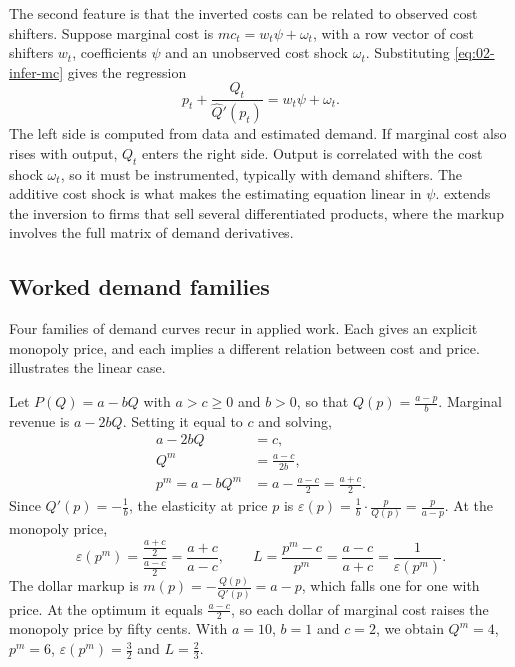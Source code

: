 The second feature is that the inverted costs can be related to observed cost shifters. Suppose marginal cost is
$mc_t = w_t\psi + \omega_t$, with a row vector of cost shifters $w_t$, coefficients $\psi$ and an unobserved cost
shock $\omega_t$. Substituting \eqref{eq:02-infer-mc} gives the regression
\begin{equation}\label{eq:02-mc-regression}
  p_t + \frac{Q_t}{\hat Q'(p_t)} = w_t\psi + \omega_t .
\end{equation}
The left side is computed from data and estimated demand. If marginal cost also rises with output, $Q_t$ enters the
right side. Output is correlated with the cost shock $\omega_t$, so it must be instrumented, typically with demand
shifters. The additive cost shock is what makes the estimating equation linear in $\psi$. 
extends the inversion to firms that sell several differentiated products, where the markup involves the full matrix
of demand derivatives.

\subsection{Worked demand families}\label{sec:02-demand-families}

Four families of demand curves recur in applied work. Each gives an explicit monopoly price, and each implies a
different relation between cost and price.  illustrates the linear case.

\begin{example}\label{ex:02-linear-monopoly}
Let $P(Q) = a - bQ$ with $a > c \ge 0$ and $b > 0$, so that $Q(p) = \frac{a - p}{b}$. Marginal revenue is
$a - 2bQ$. Setting it equal to $c$ and solving,
\begin{align*}
  a - 2bQ &= c, \\
  Q^m &= \frac{a - c}{2b}, \\
  p^m = a - bQ^m &= a - \frac{a - c}{2} = \frac{a + c}{2} .
\end{align*}
Since $Q'(p) = -\frac{1}{b}$, the elasticity at price $p$ is $\varepsilon(p) = \frac{1}{b}\cdot\frac{p}{Q(p)} =
\frac{p}{a - p}$. At the monopoly price,
\[
  \varepsilon(p^m) = \frac{\frac{a + c}{2}}{\frac{a - c}{2}} = \frac{a + c}{a - c}, \qquad
  L = \frac{p^m - c}{p^m} = \frac{a - c}{a + c} = \frac{1}{\varepsilon(p^m)} .
\]
The dollar markup is $m(p) = -\frac{Q(p)}{Q'(p)} = a - p$, which falls one for one with price. At the optimum it
equals $\frac{a - c}{2}$, so each dollar of marginal cost raises the monopoly price by fifty cents. With $a = 10$,
$b = 1$ and $c = 2$, we obtain $Q^m = 4$, $p^m = 6$, $\varepsilon(p^m) = \frac{3}{2}$ and $L = \frac{2}{3}$.
\end{example}

